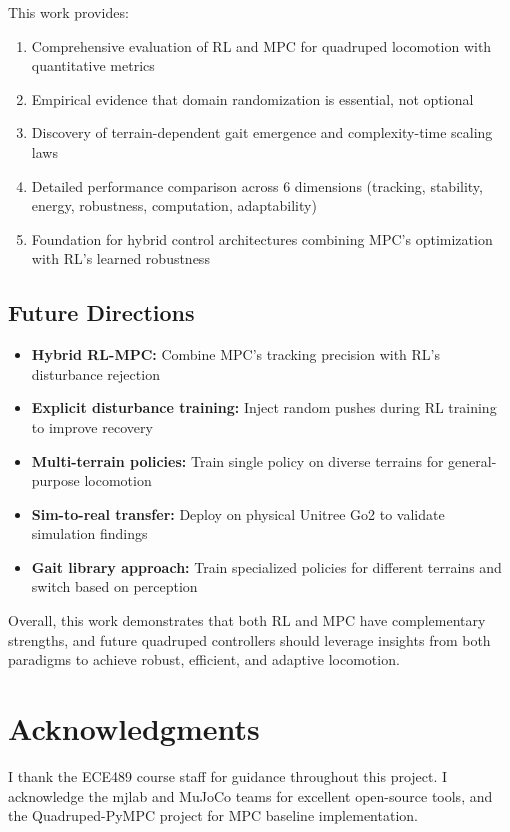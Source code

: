 \documentclass[12pt,a4paper]{article}
\begin{document}
This work provides:
\begin{enumerate}
    \item Comprehensive evaluation of RL and MPC for quadruped locomotion with quantitative metrics
    \item Empirical evidence that domain randomization is essential, not optional
    \item Discovery of terrain-dependent gait emergence and complexity-time scaling laws
    \item Detailed performance comparison across 6 dimensions (tracking, stability, energy, robustness, computation, adaptability)
    \item Foundation for hybrid control architectures combining MPC's optimization with RL's learned robustness
\end{enumerate}

\subsection{Future Directions}

\begin{itemize}
    \item \textbf{Hybrid RL-MPC:} Combine MPC's tracking precision with RL's disturbance rejection
    \item \textbf{Explicit disturbance training:} Inject random pushes during RL training to improve recovery
    \item \textbf{Multi-terrain policies:} Train single policy on diverse terrains for general-purpose locomotion
    \item \textbf{Sim-to-real transfer:} Deploy on physical Unitree Go2 to validate simulation findings
    \item \textbf{Gait library approach:} Train specialized policies for different terrains and switch based on perception
\end{itemize}

Overall, this work demonstrates that both RL and MPC have complementary strengths, and future quadruped controllers should leverage insights from both paradigms to achieve robust, efficient, and adaptive locomotion.


\section*{Acknowledgments}
I thank the ECE489 course staff for guidance throughout this project. I acknowledge the mjlab and MuJoCo teams for excellent open-source tools, and the Quadruped-PyMPC project for MPC baseline implementation.
\end{document}
